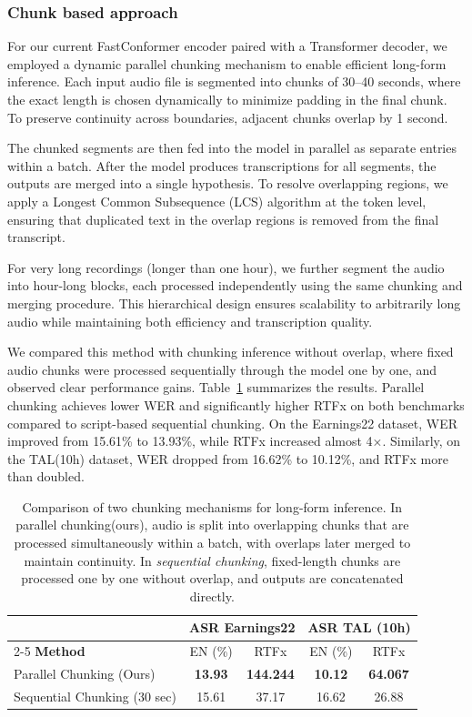 \subsubsection{Chunk based approach}

For our current FastConformer encoder paired with a Transformer decoder, we employed a dynamic parallel chunking mechanism to enable efficient long-form inference. Each input audio file is segmented into chunks of 30–40 seconds, where the exact length is chosen dynamically to minimize padding in the final chunk. To preserve continuity across boundaries, adjacent chunks overlap by 1 second.

The chunked segments are then fed into the model in parallel as separate entries within a batch. After the model produces transcriptions for all segments, the outputs are merged into a single hypothesis. To resolve overlapping regions, we apply a Longest Common Subsequence (LCS) algorithm at the token level, ensuring that duplicated text in the overlap regions is removed from the final transcript.

For very long recordings (longer than one hour), we further segment the audio into hour-long blocks, each processed independently using the same chunking and merging procedure. This hierarchical design ensures scalability to arbitrarily long audio while maintaining both efficiency and transcription quality.

We compared this method with chunking inference without overlap, where fixed audio chunks were processed sequentially through the model one by one, and observed clear performance gains. Table~\ref{tab:chunking_results} summarizes the results. Parallel chunking achieves lower WER and significantly higher RTFx on both benchmarks compared to script-based sequential chunking. On the Earnings22 dataset, WER improved from 15.61\% to 13.93\%, while RTFx increased almost 4×. Similarly, on the TAL(10h) dataset, WER dropped from 16.62\% to 10.12\%, and RTFx more than doubled.

\begin{table}[ht]
\centering
\caption{Comparison of two chunking mechanisms for long-form inference. In parallel chunking(ours), audio is split into overlapping chunks that are processed simultaneously within a batch, with overlaps later merged to maintain continuity. In \textit{sequential chunking}, fixed-length chunks are processed one by one without overlap, and outputs are concatenated directly.}
\begin{tabular}{|l|c c|c c|}
\hline
 & \multicolumn{2}{c|}{\textbf{ASR Earnings22}} & \multicolumn{2}{c|}{\textbf{ASR TAL (10h)}} \\
\cline{2-5}
\textbf{Method} & EN (\%) & RTFx & EN (\%) & RTFx \\
\hline
\rowcolor{green!15}
Parallel Chunking (Ours)             & \textbf{13.93} & \textbf{144.244} & \textbf{10.12} & \textbf{64.067} \\
Sequential Chunking (30 sec) & 15.61          & 37.17            & 16.62         & 26.88 \\
\hline
\end{tabular}
\label{tab:chunking_results}
\end{table}


